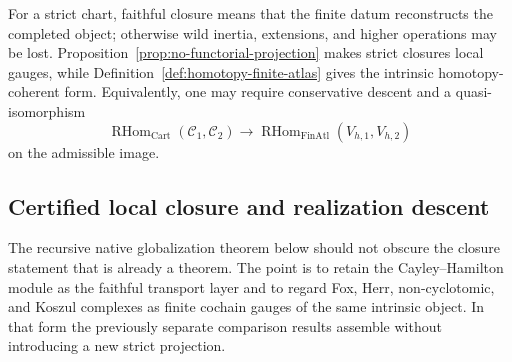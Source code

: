 \documentclass[11pt]{article}
\theoremstyle{definition}
\newcommand{\cC}{\mathcal C}
\begin{document}
For a strict chart, faithful closure means that the finite datum reconstructs the completed object; otherwise wild inertia, extensions, and higher operations may be lost.  Proposition~\ref{prop:no-functorial-projection} makes strict closures local gauges, while Definition~\ref{def:homotopy-finite-atlas} gives the intrinsic homotopy-coherent form.  Equivalently, one may require conservative descent and a quasi-isomorphism
\[
\operatorname{RHom}_{\mathrm{Cart}}(\cC_1,\cC_2)
\longrightarrow
\operatorname{RHom}_{\mathrm{FinAtl}}(V_{h,1},V_{h,2})
\]
on the admissible image.


\subsection{Certified local closure and realization descent}\label{subsec:certified-local-finite-atlas}

The recursive native globalization theorem below should not obscure the closure statement that is
already a theorem.  The point is to retain the Cayley--Hamilton module as the
faithful transport layer and to regard Fox, Herr, non-cyclotomic, and Koszul
complexes as finite cochain gauges of the same intrinsic object.  In that form
the previously separate comparison results assemble without introducing a new
strict projection.
\end{document}
